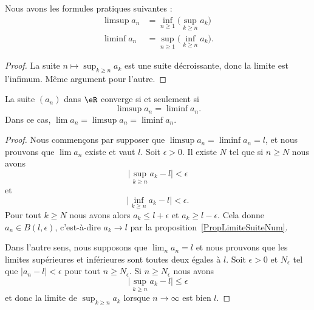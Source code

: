 \begin{lemma}     \label{ooAQTEooYDBovS}
	Nous avons les formules pratiques suivantes :
	\begin{subequations}
		\begin{align}
			\limsup a_n & =\inf_{n\geq 1}\big( \sup_{k\geq n}a_k \big)  \\
			\liminf a_n & =\sup_{n\geq 1}\big( \inf_{k\geq n}a_k \big).
		\end{align}
	\end{subequations}
\end{lemma}

\begin{proof}
	La suite \( n\mapsto \sup_{k\geq n}a_k\) est une suite décroissante, donc la limite est l'infimum. Même argument pour l'autre.
\end{proof}

\begin{lemma}       \label{ooIQIKooXWwAmM}
	La suite \( (a_n)\) dans \( \eR\) converge si et seulement si
	\begin{equation}
		\limsup a_n=\liminf a_n.
	\end{equation}
	Dans ce cas, \( \lim a_n=\limsup a_n=\liminf a_n\).
\end{lemma}

\begin{proof}
	Nous commençons par supposer que \( \limsup a_n=\liminf a_n=l\), et nous prouvons que \( \lim a_n\) existe et vaut \( l\). Soit \( \epsilon>0\). Il existe \( N\) tel que si \( n\geq N\) nous avons
	\begin{equation}
		\big| \sup_{k\geq n}a_k-l \big|<\epsilon
	\end{equation}
	et
	\begin{equation}
		\big| \inf_{k\geq n}a_k-l \big|<\epsilon.
	\end{equation}
	Pour tout \( k\geq N\) nous avons alors \( a_k\leq l+\epsilon\) et \( a_k\geq l-\epsilon\). Cela donne \( a_n\in B(l,\epsilon)\), c'est-à-dire \( a_k\to l\) par la proposition~\ref{PropLimiteSuiteNum}.

	Dans l'autre sens, nous supposons que \( \lim_n a_n=l\) et nous prouvons que les limites supérieures et inférieures sont toutes deux égales à \( l\). Soit \( \epsilon>0\) et \( N_{\epsilon}\) tel que \( | a_n-l |<\epsilon\) pour tout \( n\geq N_{\epsilon}\). Si \( n\geq N_{\epsilon}\) nous avons
	\begin{equation}
		\big| \sup_{k\geq n}a_k-l \big|\leq \epsilon
	\end{equation}
	et donc la limite de \( \sup_{k\geq n}a_k\) lorsque \( n\to \infty\) est bien \(l\).
\end{proof}

